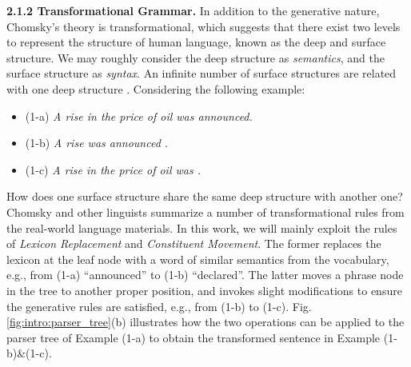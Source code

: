 \noindent\textbf{2.1.2 Transformational Grammar.} In addition to the generative nature, Chomsky's theory is transformational, which suggests that there exist two levels to represent the structure of human language, known as the deep and surface structure.
We may roughly consider the deep structure as \textit{semantics}, and the surface structure as \textit{syntax}. An infinite number of surface structures are related with one deep structure \cite{chomsky1996}. Considering the following example:
\begin{itemize}
\item (1-a) \textit{A rise in the price of oil was announced.}
\item (1-b) \textit{A rise was announced .}
\item (1-c) \textit{A rise in the price of oil was .}
\end{itemize}
How does one surface structure share the same deep structure with another one? Chomsky and other linguists summarize a number of transformational rules from the real-world language materials. In this work, we will mainly exploit the rules of \textit{Lexicon Replacement} and \textit{Constituent Movement}. The former replaces the lexicon at the leaf node with a word of similar semantics from the vocabulary, e.g., from (1-a) ``announced'' to (1-b) ``declared''. The latter moves a phrase node in the tree to another proper position, and invokes slight modifications to ensure the generative rules are satisfied, e.g., from (1-b) to (1-c). Fig.\ref{fig:intro:parser_tree}(b) illustrates how the two operations can be applied to the parser tree of Example (1-a) to obtain the transformed sentence in Example (1-b)\&(1-c). 

